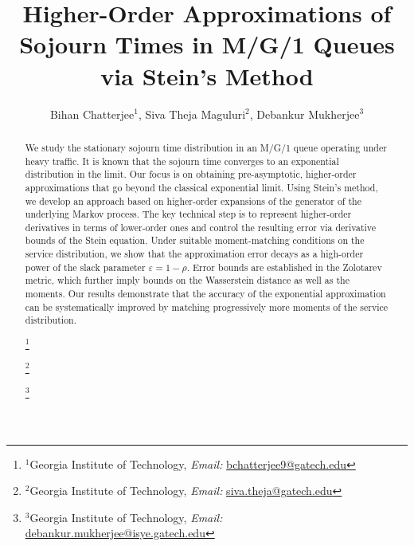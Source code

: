 \documentclass[11pt,letterpaper,reqno]{article}
\author{
  Bihan Chatterjee$^1$,  
  Siva Theja Maguluri$^2$,
  Debankur Mukherjee$^3$
}
\title{Higher-Order Approximations of Sojourn Times in M/G/1 Queues via Stein’s Method}
\date{}
\theoremstyle{thmstyleone}%
\theoremstyle{thmstyletwo}%
\theoremstyle{thmstylethree}%
\numberwithin{equation}{section}
\newcommand\blfootnote[1]{%
  \begingroup
  \renewcommand\thefootnote{}\footnote{#1}%
  \addtocounter{footnote}{-1}%
  \endgroup
}
\begin{document}
\maketitle






\begin{abstract}
 We study the stationary sojourn time distribution in an M/G/1 queue operating under heavy traffic. It is known that the sojourn time converges to an exponential distribution in the limit. 
  Our focus is on obtaining pre-asymptotic, higher-order approximations that go beyond the classical exponential limit.  Using Stein’s method, we develop an approach based on higher-order expansions of the generator of the underlying Markov process. The key technical step is to represent higher-order derivatives in terms of lower-order ones and control the resulting error via derivative bounds of the Stein equation. Under suitable moment-matching conditions on the service distribution, we show that the approximation error decays as a high-order power of the slack parameter $\varepsilon=1-\rho$. Error bounds are established in the Zolotarev metric, which further imply bounds on the Wasserstein distance as well as the moments. Our results demonstrate that the accuracy of the exponential approximation can be systematically improved by matching progressively more moments of the service distribution.

\blfootnote{$^1$Georgia Institute of Technology, \emph{Email:} \href{bchatterjee9@gatech.edu}{bchatterjee9@gatech.edu}}
\blfootnote{$^2$Georgia Institute of Technology, \emph{Email:}  \href{mailto:siva.theja@gatech.edu}{siva.theja@gatech.edu}}
\blfootnote{$^3$Georgia Institute of Technology, \emph{Email:} \href{mailto:debankur.mukherjee@isye.gatech.edu}{debankur.mukherjee@isye.gatech.edu}}


\end{abstract}
\end{document}
